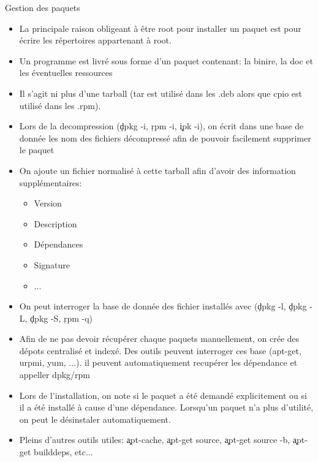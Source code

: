 \begin{frame}[fragile=singleslide]{Gestion des paquets}
  \begin{itemize}
  \item La principale raison obligeant à être root pour installer un
    paquet est pour écrire les répertoires appartenant à root.
  \item Un programme est livré sous forme d'un paquet contenant: la
    binire, la doc et les éventuelles ressources
  \item Il s'agit ni plus d'une tarball (tar est utilisé dans les .deb
    alors que cpio est utilisé dans les .rpm).
  \item Lors de la decompression (\c{dpkg -i}, \c{rpm -i}, \c{ipk
      -i}), on écrit dans une base de donnée les nom des fichiers
    décompressé afin de pouvoir facilement supprimer le paquet
  \item On ajoute un fichier normalisé à cette tarball afin d'avoir
    des information supplémentaires:
    \begin{itemize}
    \item Version
    \item Description
    \item Dépendances
    \item Signature
    \item ...
    \end{itemize}
  \item On peut interroger la base de donnée des fichier installés
    avec (\c{dpkg -l}, \c{dpkg -L}, \c{dpkg -S}, \c{rpm -q})
  \item Afin de ne pas devoir récupérer chaque paquets manuellement,
    on crée des dépots centralisé et indexé. Des outils peuvent
    interroger ces base (apt-get, urpmi, yum, ...). il peuvent
    automatiquement recupérer les dépendance et appeller dpkg/rpm
  \item Lors de l'installation, on note si le paquet a été demandé
    explicitement ou si il a été installé à cause d'une
    dépendance. Lorsqu'un paquet n'a plus d'utilité, on peut le
    désinstaler automatiquement.
  \item Pleins d'autres outils utiles: \c{apt-cache}, \c{apt-get source},
    \c{apt-get source -b}, \c{apt-get builddeps}, etc...
  \end{itemize}
\end{frame}


